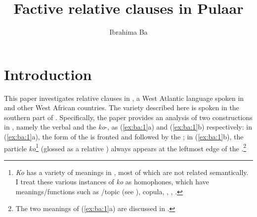 \documentclass[output=paper,
modfonts
]{langscibook}
\title{Factive relative clauses in Pulaar}
\author{Ibrahima Ba  \affiliation{The University of Kansas} }
\begin{document}
\maketitle
            

 
\section{Introduction}\label{sec:ba:1}
This paper investigates  relative clauses in , a West Atlantic language spoken in  and other West African countries. The  variety described here is spoken in the southern part of . Specifically, the paper provides an analysis of two  constructions in , namely the verbal  and the \textit{ko}{}-, as (\ref{ex:ba:1}a) and (\ref{ex:ba:1}b) respectively: in (\ref{ex:ba:1}a), the  form of the  is fronted and followed by the ; in (\ref{ex:ba:1}b), the particle \textit{ko}\footnote{\textit{Ko} has a variety of meanings in , most of which are not related semantically. I treat these various instances of \textit{ko} as homophones, which have meanings/functions such as /topic (see \citealt{Cover2006}), copula, , , .} (glossed as a relative ) always appears at the leftmost edge of the .\footnote{The two meanings of (\ref{ex:ba:1}a) are discussed in .}
\end{document}
